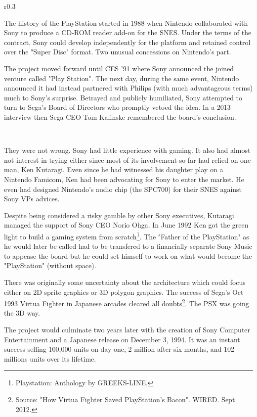 \begin{wrapfigure}[11]{r}{0.3\textwidth}{
\centering {}}
\end{wrapfigure}
The history of the PlayStation started in 1988 when Nintendo collaborated with Sony to produce a CD-ROM reader add-on for the SNES. Under the terms of the contract, Sony could develop independently for the platform and retained control over the "Super Disc" format. Two unusual concessions on Nintendo's part.\\
\par
 The project moved forward until CES '91 where Sony announced the joined venture called "Play Station". The next day, during the same event, Nintendo announced it had instead partnered with Philips (with much advantageous terms) much to Sony's surprise. Betrayed and publicly humiliated, Sony attempted to turn to Sega's Board of Directors who promptly vetoed the idea. In a 2013 interview then Sega CEO Tom Kalinske remembered the board's conclusion.\\
\par
{}\\
\par
They were not wrong. Sony had little experience with gaming. It also had almost not interest in trying either since most of its involvement so far had relied on one man, Ken Kutaragi. Even since he had witnessed his daughter play on a Nintendo Famicom, Ken had been advocating for Sony to enter the market. He even had designed Nintendo's audio chip (the SPC700) for their SNES against Sony VPs advices.\\
\par
 Despite being considered a risky gamble by other Sony executives, Kutaragi managed the support of Sony CEO Norio Ohga. In June 1992 Ken got the green light to build a gaming system from scratch\footnote{Playstation: Anthology by GREEKS-LINE.}. The "Father of the PlayStation" as he would later be called had to be transfered to a financially separate Sony Music to appease the board but he could set himself to work on what would become the "PlayStation" (without space).\\
\par
There was originally some uncertainty about the architecture which could focus either on 2D sprite graphics or 3D polygon graphics. The success of Sega's Oct 1993 Virtua Fighter in Japanese arcades cleared all doubts\footnote{Source: "How Virtua Fighter Saved PlayStation's Bacon". WIRED. Sept 2012.}. The PSX was going the 3D way.\\
\par
The project would culminate two years later with the creation of Sony Computer Entertainment and a Japanese release on December 3, 1994. It was an instant success selling 100,000 units on day one, 2 million after six months, and  102 millions units over its lifetime.\\
\par

